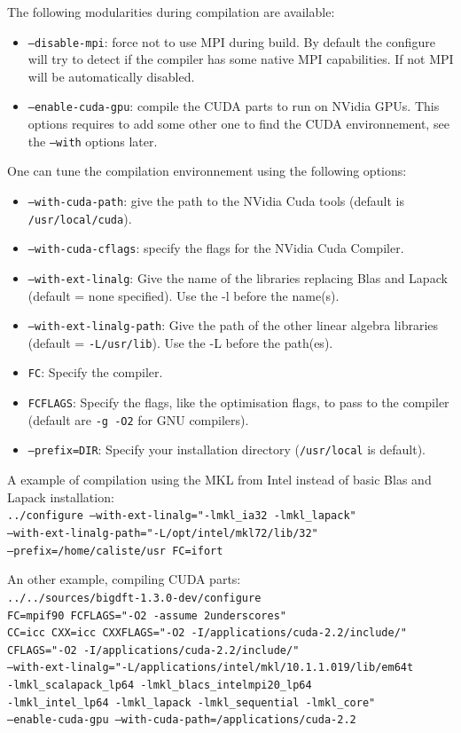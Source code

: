 \documentclass[a4paper,11pt]{report}
\begin{document}
The following modularities during compilation are available:
\begin{itemize}
  \item \texttt{--disable-mpi}: force not to use MPI during build. By default the configure will try to detect if the compiler has some native MPI capabilities. If not MPI will be automatically disabled.
  \item \texttt{--enable-cuda-gpu}: compile the CUDA parts to run on NVidia GPUs. This options requires to add some other one to find the CUDA environnement, see the \texttt{--with} options later.
\end{itemize}

One can tune the compilation environnement using the following options:
\begin{itemize}
  \item \texttt{--with-cuda-path}: give the path to the NVidia Cuda tools (default is \texttt{/usr/local/cuda}).
  \item \texttt{--with-cuda-cflags}: specify the flags for the NVidia Cuda Compiler.
  \item \texttt{--with-ext-linalg}: Give the name of the libraries replacing Blas and Lapack (default = none specified). Use the -l before the name(s).
  \item \texttt{--with-ext-linalg-path}: Give the path of the other linear algebra libraries (default = \texttt{-L/usr/lib}). Use the -L before the path(es).
  \item \texttt{FC}: Specify the compiler.
  \item \texttt{FCFLAGS}: Specify the flags, like the
optimisation flags, to pass to the compiler (default are \texttt{-g
-O2} for GNU compilers).
  \item \texttt{--prefix=DIR}: Specify your installation directory (\texttt{/usr/local} is default).
\end{itemize}

A example of compilation using the MKL from Intel instead of basic Blas and Lapack installation:\\
\texttt{../configure --with-ext-linalg="-lmkl\_ia32 -lmkl\_lapack"\\
   --with-ext-linalg-path="-L/opt/intel/mkl72/lib/32"\\
   --prefix=/home/caliste/usr FC=ifort}

An other example, compiling CUDA parts:\\
\texttt{../../sources/bigdft-1.3.0-dev/configure\\
  FC=mpif90 FCFLAGS="-O2  -assume 2underscores"\\
  CC=icc CXX=icc CXXFLAGS="-O2  -I/applications/cuda-2.2/include/"\\
  CFLAGS="-O2  -I/applications/cuda-2.2/include/"\\
  --with-ext-linalg="-L/applications/intel/mkl/10.1.1.019/lib/em64t\\
                     -lmkl\_scalapack\_lp64 -lmkl\_blacs\_intelmpi20\_lp64\\
                     -lmkl\_intel\_lp64 -lmkl\_lapack -lmkl\_sequential -lmkl\_core"\\
  --enable-cuda-gpu --with-cuda-path=/applications/cuda-2.2}
\end{document}
